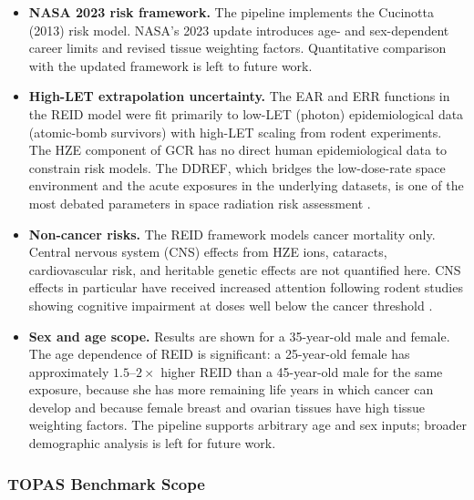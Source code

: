 \begin{itemize}
  \item \textbf{NASA 2023 risk framework.}
        The pipeline implements the Cucinotta (2013) risk model.
        NASA's 2023 update introduces age- and sex-dependent career limits
        and revised tissue weighting factors.
        Quantitative comparison with the updated framework is left to
        future work.

  \item \textbf{High-LET extrapolation uncertainty.}
        The EAR and ERR functions in the REID model were fit primarily to
        low-LET (photon) epidemiological data (atomic-bomb survivors)
        with high-LET scaling from rodent experiments.
        The HZE component of GCR has no direct human epidemiological
        data to constrain risk models.
        The DDREF, which bridges the low-dose-rate space environment
        and the acute exposures in the underlying datasets, is one of
        the most debated parameters in space radiation risk assessment
        \citep{durant2013}.

  \item \textbf{Non-cancer risks.}
        The REID framework models cancer mortality only.
        Central nervous system (CNS) effects from HZE ions, cataracts,
        cardiovascular risk, and heritable genetic effects are not
        quantified here.
        CNS effects in particular have received increased attention
        following rodent studies showing cognitive impairment at doses
        well below the cancer threshold \citep{cucinotta2014cns}.

  \item \textbf{Sex and age scope.}
        Results are shown for a 35-year-old male and female.
        The age dependence of REID is significant: a 25-year-old female
        has approximately $1.5$--$2\times$ higher REID than a 45-year-old
        male for the same exposure, because she has more remaining life years
        in which cancer can develop and because female breast and ovarian
        tissues have high tissue weighting factors.
        The pipeline supports arbitrary age and sex inputs;
        broader demographic analysis is left for future work.
\end{itemize}

\subsubsection{TOPAS Benchmark Scope}

